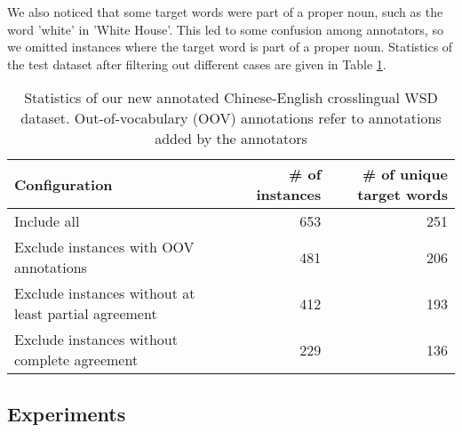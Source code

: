 

We also noticed that some target words were part of a proper noun, such as the word 'white' in 'White House'. This led to some confusion among annotators, so we omitted instances where the target word is part of a proper noun. Statistics of the test dataset after filtering out different cases are given in Table \ref{table:CLWSD-test-stats-no-ne}.

\begin{table}[ht]
	\caption{Statistics of our new annotated Chinese-English crosslingual WSD dataset. Out-of-vocabulary (OOV) annotations refer to annotations added by the annotators}
	\label{table:CLWSD-test-stats-no-ne}
	\begin{center}
		\begin{tabular}{| p{8cm} | r| r|}
			\hline
			{\bf Configuration} & {\bf \# of instances} & {\bf \# of unique target words} \\
			\hline
			Include all & 653 & 251\\ 
			\hline
			Exclude instances with OOV annotations & 481 & 206 \\						
			\hline
			Exclude instances without at least partial agreement & 412 & 193 \\
			\hline
			Exclude instances without complete agreement & 229 & 136 \\
			\hline
		\end{tabular}
	\end{center}
\end{table}

\subsection{Experiments}

